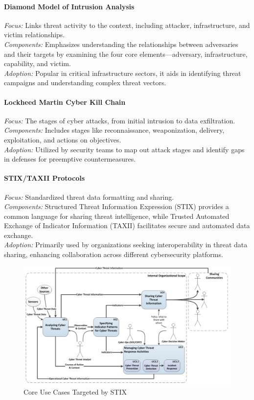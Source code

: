 \documentclass[a4paper,twoside,12pt]{report}
\begin{document}
\paragraph{Diamond Model of Intrusion Analysis \citet{caltagirone2013diamond}}
\textit{Focus:} Links threat activity to the context, including attacker, infrastructure, and victim relationships. \\
\textit{Components:} Emphasizes understanding the relationships between adversaries and their targets by examining the four core elements—adversary, infrastructure, capability, and victim. \\
\textit{Adoption:} Popular in critical infrastructure sectors, it aids in identifying threat campaigns and understanding complex threat vectors.

\paragraph{Lockheed Martin Cyber Kill Chain \citet{naik2022comparing}}
\textit{Focus:} The stages of cyber attacks, from initial intrusion to data exfiltration. \\
\textit{Components:} Includes stages like reconnaissance, weaponization, delivery, exploitation, and actions on objectives. \\
\textit{Adoption:} Utilized by security teams to map out attack stages and identify gaps in defenses for preemptive countermeasures.

\paragraph{STIX/TAXII Protocols \citet{provatas2023standards}}
\textit{Focus:} Standardized threat data formatting and sharing. \\
\textit{Components:} Structured Threat Information Expression (STIX) provides a common language for sharing threat intelligence, while Trusted Automated Exchange of Indicator Information (TAXII) facilitates secure and automated data exchange. \\
\textit{Adoption:} Primarily used by organizations seeking interoperability in threat data sharing, enhancing collaboration across different cybersecurity platforms.
\begin{figure}[ht]
    \centering
    \includegraphics[width=1.0\linewidth]{images/stix-system.png}  %
    \caption{\citep{barnum2012standardizing} Core Use Cases Targeted by STIX}
    \label{fig:thing1}
\end{figure}
\end{document}
